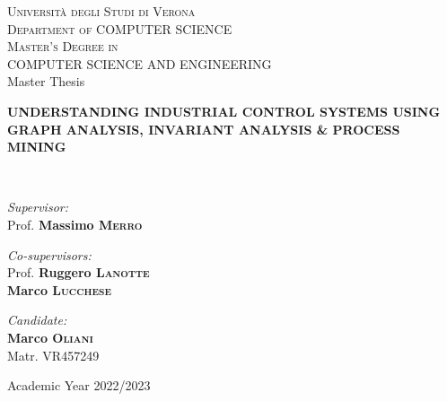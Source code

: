 \documentclass[a4paper,12pt,openright,twoside,titlepage]{book}
\newcommand{\thesistitle}{Understanding Industrial Control Systems using Graph Analysis, Invariant Analysis \& Process Mining}
\newcommand{\supervisor}{Prof. \textbf{Massimo \textsc{Merro}}}
\newcommand{\firstcosupervisor}{Prof. \textbf{Ruggero \textsc{Lanotte}}}
\newcommand{\secondcosupervisor}{\textbf{Marco \textsc{Lucchese}}}
\newcommand{\candidate}{\textbf{Marco \textsc{Oliani}}\\ Matr. VR457249}
\newcommand{\academicyear}{\large Academic Year 2022/2023}
\begin{document}
\begin{titlepage}
	\begin{center}
		\thispagestyle{empty}
		
		
		
		\textsc{\LARGE Università degli Studi di Verona}\\
		\textsc{Department of COMPUTER SCIENCE}\\[1.0cm]
		\textsc{\large Master's Degree in \\ 
			COMPUTER SCIENCE AND ENGINEERING}\\[1.5cm]
		
		\large Master Thesis \\[0.5cm]
		
		\hrulefill
		

		{ \Large\bfseries\MakeUppercase{\thesistitle}}
		
		\hrulefill \\[2.0cm]
		
		\begin{minipage}[t]{0.45\textwidth}
			\begin{flushleft} \large
				\emph{Supervisor:}\\
				\supervisor 
			\end{flushleft}
			\begin{flushleft} \large
				\emph{Co-supervisors:}\\
				\firstcosupervisor \\
				\secondcosupervisor
			\end{flushleft}
		\end{minipage}
		\begin{minipage}[t]{0.45\textwidth}\raggedleft
			\begin{flushright} \large
				\emph{Candidate:} \\
				\candidate
			\end{flushright}
		\end{minipage}
		
		\vfill
		
		\academicyear
		
	\end{center}
\end{titlepage}
\end{document}
